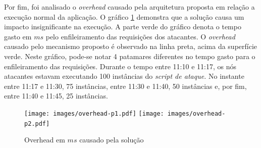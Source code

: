 Por fim, foi analisado o \emph{overhead} causado pela arquitetura proposta em relação a execução normal da aplicação. O gráfico \ref{fig:overhead} demonstra que a solução causa um impacto insignificante na execução. A parte verde do gráfico denota o tempo gasto em $ms$ pelo enfileiramento das requisições dos atacantes. O \emph{overhead} causado pelo mecanismo proposto é observado na linha preta, acima da superfície verde. Neste gráfico, pode-se notar 4 patamares diferentes no tempo gasto para o enfileiramento das requisições. Durante o tempo entre 11:10 e 11:17, os nós atacantes estavam executando 100 instâncias do \emph{script de ataque.} No instante entre 11:17 e 11:30, 75 instâncias, entre 11:30 e 11:40, 50 instâncias e, por fim, entre 11:40 e 11:45, 25 instâncias.

\begin{figure}[h!]
  \centering
  \texttt{[image: images/overhead-p1.pdf]}
  \texttt{[image: images/overhead-p2.pdf]}
  \caption{Overhead em $ms$ causado pela solução}
	\label{fig:overhead}
\end{figure}


